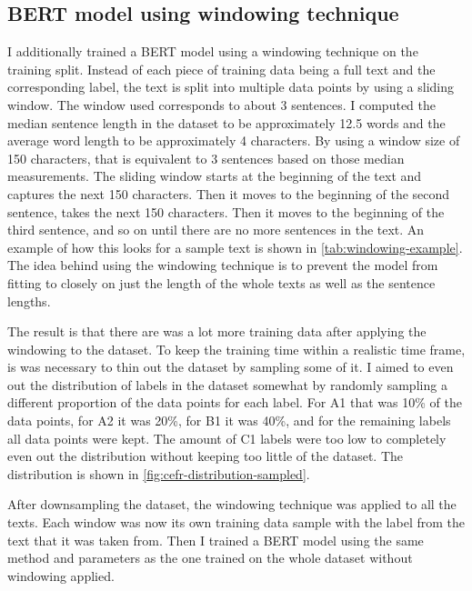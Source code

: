 \documentclass[11pt,a4paper]{article}
\begin{document}
\subsection{BERT model using windowing technique}

I additionally trained a BERT model using a windowing technique on the training
split. Instead of each piece of training data being a full text and the
corresponding label, the text is split into multiple data points by using a
sliding window. The window used corresponds to about 3 sentences. I computed
the median sentence length in the dataset to be approximately 12.5 words and
the average word length to be approximately 4 characters. By using a window
size of 150 characters, that is equivalent to 3 sentences based on those median
measurements. The sliding window starts at the beginning of the text and
captures the next 150 characters. Then it moves to the beginning of the second
sentence, takes the next 150 characters. Then it moves to the beginning of the
third sentence, and so on until there are no more sentences in the text. An
example of how this looks for a sample text is shown in
\autoref{tab:windowing-example}. The idea behind using the windowing technique
is to prevent the model from fitting to closely on just the length of the whole texts
as well as the sentence lengths.

The result is that there are was a lot more training data after applying the
windowing to the dataset. To keep the training time within a realistic time frame, is was
necessary to thin out the dataset by sampling some of it. I aimed to even out
the distribution of labels in the dataset somewhat by randomly sampling
a different proportion of the data points for each label. For A1 that was 10\%
of the data points, for A2 it was 20\%, for B1 it was 40\%, and for the
remaining labels all data points were kept. The amount of C1 labels were too
low to completely even out the distribution without keeping too little
of the dataset. The distribution is shown in
\autoref{fig:cefr-distribution-sampled}.

After downsampling the dataset, the windowing technique was applied to all the
texts. Each window was now its own training data sample with the label from the
text that it was taken from. Then I trained a BERT model using the same method
and parameters as the one trained on the whole dataset without windowing
applied.
\end{document}
